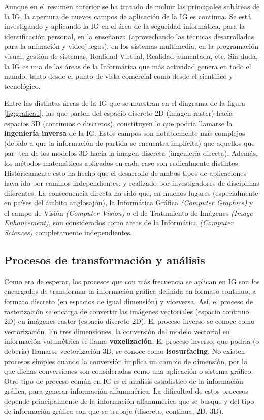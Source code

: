 Aunque en el resumen anterior se ha tratado de incluir las principales subáreas de la IG, la apertura de nuevos campos de aplicación de la IG es continua. Se está investigando y aplicando la IG en el área de la seguridad informática, para la identificación personal, en la enseñanza (aprovechando las técnicas desarrolladas para la animación y videojuegos), en los sistemas multimedia, en la programación visual, gestión de sistemas, Realidad Virtual, Realidad aumentada, etc. Sin duda, la IG es una de las áreas de la Informática que más actividad genera en todo el mundo, tanto desde el punto de vista comercial como desde el científico y tecnológico.

Entre las distintas áreas de la IG que se muestran en el diagrama de la figura \ref{fig:grafica1}, las que parten del espacio discreto 2D (imagen raster) hacia espacios 3D (continuos o discretos), constituyen lo que podría llamarse la \textbf{ingeniería inversa} de la IG. Estos campos son notablemente más complejos (debido a que la información de partida se encuentra implícita) que aquellos que par- ten de los modelos 3D hacia la imagen discreta (ingeniería directa). Además, los métodos matemáticos aplicados en cada caso son radicalmente distintos. Históricamente esto ha hecho que el desarrollo de ambos tipos de aplicaciones haya ido por caminos independientes, y realizado por investigadores de disciplinas diferentes. La consecuencia directa ha sido que, en muchos lugares (especialmente en países del ámbito anglosajón), la Informática Gráfica \textit{(Computer Graphics)} y el campo de Visión \textit{(Computer Vision)} o el de Tratamiento de Imágenes \textit{(Image Enhancement)}, son considerados como áreas de la Informática \textit{(Computer Sciences)} completamente independientes.

\subsection{Procesos de transformación y análisis}
Como era de esperar, los procesos que con más frecuencia se aplican en IG son los encargados de transformar la información gráfica definida en formato continuo, a formato discreto (en espacios de igual dimensión) y viceversa.
Así, el proceso de rasterización se encarga de convertir las imágenes vectoriales (espacio continuo 2D) en imágenes raster (espacio discreto 2D). El proceso inverso se conoce como vectorización. En tres dimensiones, la conversión del modelo vectorial en información volumétrica se llama \textbf{voxelización}. El proceso inverso, que podría (o debería) llamarse vectorización 3D, se conoce como \textbf{isosurfacing}. No existen procesos simples cuando la conversión implica un cambio de dimensión, por lo que dichas conversiones son consideradas como una aplicación o sistema gráfico.
Otro tipo de proceso común en IG es el análisis estadístico de la información gráfica, para generar información alfanumérica. La dificultad de estos procesos depende principalmente de la información alfanumérica que se busque y del tipo de información gráfica con que se trabaje (discreta, continua, 2D, 3D).



